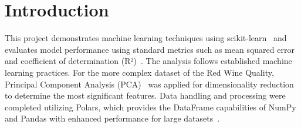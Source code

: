 \section{Introduction}
This project demonstrates machine learning techniques using scikit-learn~\cite{sklearn_linear_model,sklearn_pca} 
and evaluates model performance using standard metrics such as mean squared error~\cite{wiki_mse} 
and coefficient of determination (R²)~\cite{wiki_r_squared}. The analysis follows established 
machine learning practices. For the more complex dataset of the Red Wine Quality, Principal Component Analysis (PCA)~\cite{wiki_pca, sklearn_pca}
was applied for dimensionality reduction to determine the most significant features. Data handling and processing were completed utilizing Polars, which provides the DataFrame capabilities of 
NumPy and Pandas with enhanced performance for large datasets~\cite{polars}.

